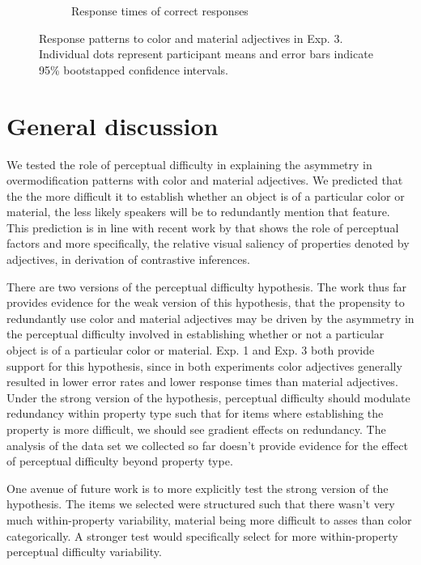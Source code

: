 \documentclass[12pt,letterpaper]{article}
\begin{document}
\begin{figure}[ht]
\begin{subfigure}{.4 \textwidth}
   \caption{Response times of correct responses}
   \label{fig:exp3_b}
   \end{subfigure}
   \caption{Response patterns to color and material adjectives in Exp. 3. Individual dots represent participant means and error bars indicate 95\% bootstapped confidence intervals.}
   \label{fig:exp3}
\end{figure}   

\section{General discussion} 

We tested the role of perceptual difficulty in explaining the asymmetry in overmodification patterns with color and material adjectives. We predicted that the the more difficult it to establish whether an object is of a particular color or material, the less likely speakers will be to redundantly mention that feature. This prediction is in line with recent work by \citet{RubioEtAl2019} that shows the role of perceptual factors and more specifically, the relative visual saliency of properties denoted by adjectives, in derivation of contrastive inferences.

There are two versions of the perceptual difficulty hypothesis. The work thus far provides evidence for the weak version of this hypothesis, that the propensity to redundantly use color and material adjectives may be driven by the asymmetry in the perceptual difficulty involved in establishing whether or not a particular object is of a particular color or material. Exp. 1 and Exp. 3 both provide support for this hypothesis, since in both experiments color adjectives generally resulted in lower error rates and lower response times than material adjectives. Under the strong version of the hypothesis, perceptual difficulty should modulate redundancy within property type such that for items where establishing the property is more difficult, we should see gradient effects on redundancy. The analysis of the data set we collected so far doesn't provide evidence for the effect of perceptual difficulty beyond property type. 

One avenue of future work is to more explicitly test the strong version of the hypothesis. The items we selected were structured such that there wasn't very much within-property variability, material being more difficult to asses than color categorically. A stronger test would specifically select for more within-property perceptual difficulty variability.
\end{document}

